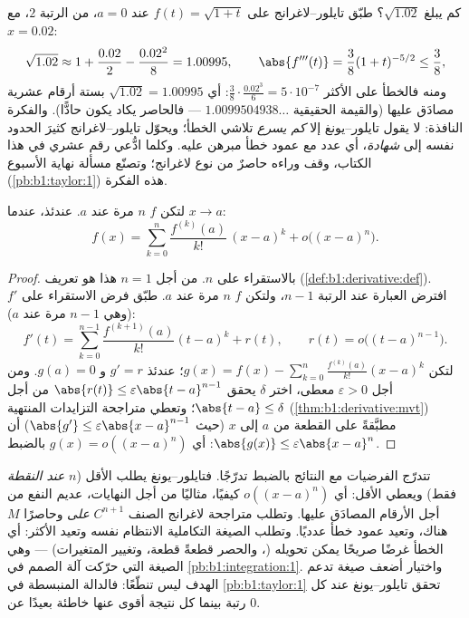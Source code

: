 \begin{example}\label{ex:b1:taylor:certified}
كم يبلغ $\sqrt{1.02}$؟ طبّق تايلور--لاغرانج على $f(t) =
\sqrt{1 + t}$ عند $a = 0$، من الرتبة $2$، مع $x = 0.02$:
\[
\sqrt{1.02} \approx 1 + \frac{0.02}{2} - \frac{0.02^2}{8}
= 1.00995 ,
\qquad
\abs{f'''(t)} = \frac{3}{8}(1+t)^{-5/2} \leq \frac 38 ,
\]
ومنه فالخطأ على الأكثر $\frac38 \cdot \frac{0.02^3}{6} =
5\cdot10^{-7}$: أي $\sqrt{1.02} = 1.00995$ بستة أرقام عشرية
مصادَق عليها (والقيمة الحقيقية $1.0099504938\dots$ --- فالحاصر يكاد
يكون حادًّا). والفكرة النافذة: لا يقول تايلور--يونغ إلا \emph{كم
يسرع} تلاشي الخطأ؛ ويحوّل تايلور--لاغرانج كثيرَ الحدود نفسه
إلى \emph{شهادة}، أي عدد مع عمود خطأ مبرهن عليه. وكلما
ادُّعي رقم عشري في هذا الكتاب، وقف وراءه
حاصرٌ من نوع لاغرانج؛ وتصنّع مسألة نهاية الأسبوع
(\cref{pb:b1:taylor:1}) هذه الفكرة.
\end{example}

\begin{theorem}\label{thm:b1:taylor:young}
لتكن $f$  $n$ مرة عند $a$. عندئذ، عندما $x \to a$:
\[
f(x) = \sum_{k=0}^{n} \frac{f^{(k)}(a)}{k!}\,(x-a)^k
+ o\bigl((x-a)^n\bigr) .
\]
\end{theorem}

\begin{proof}
بالاستقراء على $n$. من أجل $n = 1$ هذا هو تعريف
 (\cref{def:b1:derivative:def}). افترض العبارة عند
الرتبة $n - 1$، ولتكن $f$  $n$ مرة عند $a$. طبّق
فرض الاستقراء على $f'$ (وهي  $n-1$ مرة
عند $a$):
\[
f'(t) = \sum_{k=0}^{n-1} \frac{f^{(k+1)}(a)}{k!}(t-a)^k + r(t),
\qquad r(t) = o\bigl((t-a)^{n-1}\bigr).
\]
لتكن $g(x) = f(x) - \sum_{k=0}^{n} \frac{f^{(k)}(a)}{k!}(x-a)^k$؛ عندئذ
$g' = r$ و $g(a) = 0$. ومن أجل $\varepsilon > 0$ معطى، اختر $\delta$
يحقق $\abs{r(t)} \leq \varepsilon\abs{t - a}^{n-1}$ من أجل $\abs{t-a}
\leq \delta$؛ وتعطي متراجحة التزايدات المنتهية
(\cref{thm:b1:derivative:mvt}) مطبَّقةً على القطعة من $a$ إلى
$x$ (حيث $\abs{g'} \leq \varepsilon\abs{x-a}^{n-1}$) أن
$\abs{g(x)} \leq \varepsilon\abs{x - a}^n$: أي $g(x) =
o((x-a)^n)$ بالضبط.
\end{proof}

\begin{remark}
تتدرّج الفرضيات مع النتائج بالضبط تدرّجًا.
فتايلور--يونغ يطلب الأقل ($n$  \emph{عند
النقطة} فقط) ويعطي الأقل: أي $o((x-a)^n)$ كيفيًا،
مثاليًا من أجل النهايات، عديم النفع من أجل الأرقام المصادَق عليها. وتطلب
متراجحة لاغرانج الصنف $C^{n+1}$ \emph{على } وحاصرًا
$M$ هناك، وتعيد عمود خطأ عدديًا. وتطلب الصيغة
التكاملية الانتظام نفسه وتعيد الأكثر: أي الخطأ
غرضًا صريحًا يمكن تحويله (، والحصر
قطعةً قطعة، وتغيير المتغيرات) --- وهي الصيغة التي حرّكت
آلة الصمم في \cref{pb:b1:integration:1}. واختيار
أضعف صيغة تدعم الهدف ليس تنطّعًا: فالدالة
المنبسطة في \cref{pb:b1:taylor:1} تحقق تايلور--يونغ
عند كل رتبة بينما كل نتيجة أقوى عنها
خاطئة بعيدًا عن $0$.
\end{remark}


